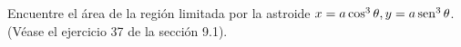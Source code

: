 \item Encuentre el área de la región limitada por la astroide $x = a\cos^3\theta, y = a\operatorname{sen}^3\theta$. (Véase el ejercicio 37 de la sección 9.1).
